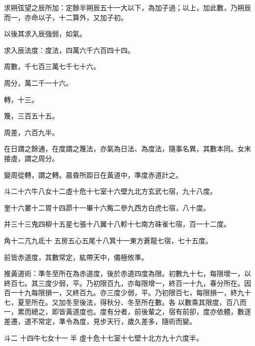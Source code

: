 \begin{pinyinscope}
 求朔弦望之辰所加：定餘半朔辰五十一大以下，為加子過；以上，加此數，乃朔辰而一，亦命以子，十二算外，又加子初。



 以後其求入辰強弱，如氣。



 求入辰法度：度法，四萬六千六百四十四。



 周數，千七百三萬七千七十六。



 周分，萬二千一十六。



 轉，十三。



 篾，三百五十五。



 周差，六百九半。



 在日謂之餘通，在度謂之篾法，亦氣為日法、為度法，隨事名異，其數本同。女末接虛，謂之周分。



 變周從轉，謂之轉。晨昏所距日在黃道中，準度赤道計之。



 斗二十六牛八女十二虛十危十七室十六壁九北方玄武七宿，九十八度。



 奎十六婁十二胃十四昴十一畢十六觜二參九西方白虎七宿，八十度。



 井三十三鬼四柳十五星七張十八翼十八軫十七南方硃雀七宿，百一十二度。



 角十二亢九氐十
 五房五心五尾十八箕十一東方蒼龍七宿，七十五度。



 前皆赤道度，其數常定，紘帶天中，儀極攸準。



 推黃道術：準冬至所在為赤道度，後於赤道四度為限。初數九十七，每限增一，以終百七。其三度少弱，平。乃初限百九，亦每限增一，終百一十九，春分所在。因百一十九每限損一，又終百九。亦三度少弱，平。乃初限百七，每限損一，終九十七，夏至所在。又加冬至後法，得秋分、冬至所在數。各
 以數乘其限度，百八而一，累而總之，即皆黃道度也。度有分者，前後輩之，宿有前卻，度亦依體，數逐差遷，道不常定，準令為度，見步天行，歲久差多，隨術而變。



 斗二
 十四牛七女十一
 半
 虛十危十七室十七壁十北方九十六度半。




\end{pinyinscope}

